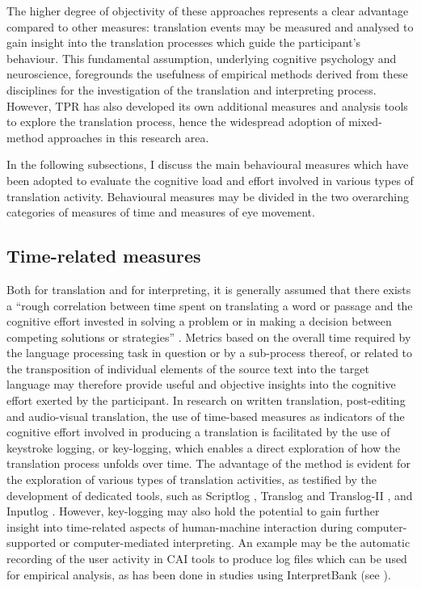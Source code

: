 The higher degree of objectivity of these approaches represents a clear advantage compared to other measures: translation events may be measured and analysed to gain insight into the translation processes which guide the participant's behaviour. This fundamental assumption, underlying cognitive psychology and neuroscience, foregrounds the usefulness of empirical methods derived from these disciplines for the investigation of the translation and interpreting process. However, TPR has also developed its own additional measures and analysis tools to explore the translation process, hence the widespread adoption of mixed-method approaches in this research area. 

In the following subsections, I discuss the main behavioural measures which have been adopted to evaluate the cognitive load and effort involved in various types of translation activity. Behavioural measures may be divided in the two overarching categories of measures of time and measures of eye movement.

\subsection{Time-related measures} \label{timerelatedm}
Both for translation and for interpreting, it is generally assumed that there exists a ``rough correlation between time spent on translating a word or passage and the cognitive effort invested in solving a problem or in making a decision between competing solutions or strategies'' \citep[30]{jakobsen_TPR_2017}. Metrics based on the overall time required by the language processing task in question or by a sub-process thereof, or related to the transposition of individual elements of the source text into the target language may therefore provide useful and objective insights into the cognitive effort exerted by the participant. In research on written translation, post-editing and audio-visual translation, the use of time-based measures as indicators of the cognitive effort involved in producing a translation is facilitated by the use of keystroke logging, or key-logging, which enables a direct exploration of how the translation process unfolds over time. The advantage of the method is evident for the exploration of various types of translation activities, as testified by the development of dedicated tools, such as Scriptlog \citep{andersson_combining_2006}, Translog and Translog-II \citep{jakobsen_translog_2006}, and Inputlog \citep{leijten_keystroke_2013}. However, key-logging may also hold the potential to gain further insight into time-related aspects of human-machine interaction during computer-supported or computer-mediated interpreting. An example may be the automatic recording of the user activity in CAI tools to produce log files which can be used for empirical analysis, as has been done in studies using InterpretBank (see \citealt{biagini_glossario_2015,prandi_uso_2015,prandi_use_2015,prandi_exploratory_2018}).

